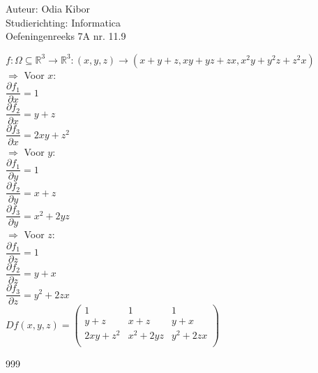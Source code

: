 \documentclass[a4paper]{article}
\begin{document}
  
\noindent \large Auteur: Odia Kibor \\
\noindent \large Studierichting: Informatica\\
\noindent \large Oefeningenreeks 7A nr. 11.9
\\

\medskip

\normalsize


$f:\Omega \subseteq \mathbb{R}^3 \rightarrow \mathbb{R}^3 : (x,y,z) \rightarrow \left(x + y + z, xy + yz + zx, x^2y + y^2z + z^2x\right)$\\

$\Rightarrow$ Voor $x$:\\

$\dfrac{\partial f_1}{\partial x} = 1$\\

$\dfrac{\partial f_2}{\partial x} = y + z$\\

$\dfrac{\partial f_3}{\partial x} = 2xy + z^2$\\

$\Rightarrow$ Voor $y$:\\

$\dfrac{\partial f_1}{\partial y} = 1$\\

$\dfrac{\partial f_2}{\partial y} = x + z$\\

$\dfrac{\partial f_3}{\partial y} = x^2 + 2yz$\\

$\Rightarrow$ Voor $z$:\\

$\dfrac{\partial f_1}{\partial z} = 1$\\

$\dfrac{\partial f_2}{\partial z} = y + x$\\

$\dfrac{\partial f_3}{\partial z} = y^2 + 2zx$\\

$Df(x,y,z)= \left(\begin{array}{ccc}
1 & 1 & 1\\
y + z & x + z & y + x\\
2xy + z^2 & x^2 + 2yz & y^2 + 2zx\\
\end{array} \right)$\\




















\begin{thebibliography}{999}
\end{thebibliography}
\end{document}
